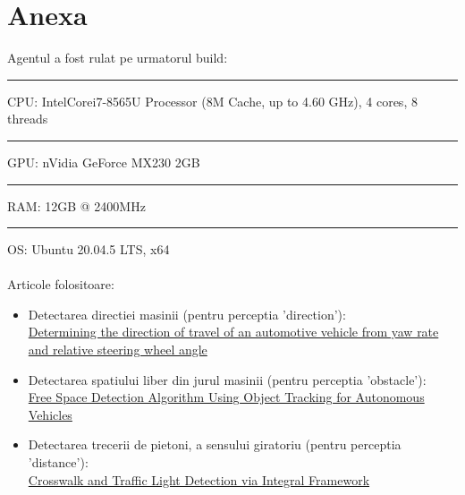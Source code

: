\documentclass[a4paper,12pt]{report}
\begin{document}
\chapter{Anexa}
Agentul a fost rulat pe urmatorul build: \\
\rule{1cm}* CPU: Intel\textcopyright Core\textregistered i7-8565U Processor (8M Cache, up to 4.60 GHz), 4 cores, 8 threads \\
\rule{1cm}* GPU: nVidia GeForce MX230 2GB \\
\rule{1cm}* RAM: 12GB @ 2400MHz \\
\rule{1cm}* OS: Ubuntu 20.04.5 LTS, x64 \\
\\
Articole folositoare: \\
\begin{itemize}
    \item Detectarea directiei masinii (pentru perceptia 'direction'): \\ \href{https://www.freepatentsonline.com/6141605.html}{Determining the direction of travel of an automotive vehicle from yaw rate and relative steering wheel angle} 
    \item Detectarea spatiului liber din jurul masinii (pentru perceptia 'obstacle'): \\
    \href{https://www.mdpi.com/1424-8220/22/1/315}{Free Space Detection Algorithm Using Object Tracking for Autonomous Vehicles}
    \item Detectarea trecerii de pietoni, a sensului giratoriu (pentru perceptia 'distance'): \\
    \href{https://koasas.kaist.ac.kr/bitstream/10203/259082/1/75167.pdf}{Crosswalk and Traffic Light Detection via Integral Framework}
\end{itemize}
\end{document}
